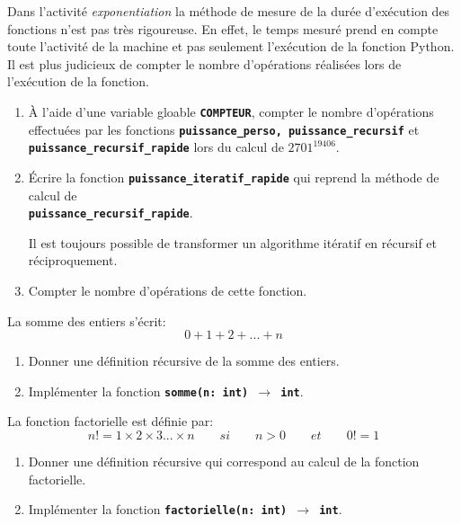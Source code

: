 \documentclass[a4paper,11pt]{article}
\begin{document}
\begin{exo}
    Dans l'activité \emph{exponentiation} la méthode de mesure de la durée d'exécution des fonctions n'est pas très rigoureuse. En effet, le temps mesuré prend en compte toute l'activité de la machine et pas seulement l'exécution de la fonction Python. Il est plus judicieux de compter le nombre d'opérations réalisées lors de l'exécution de la fonction.
    \begin{enumerate}
        \item À l'aide d'une variable gloable \textbf{\texttt{COMPTEUR}}, compter le nombre d'opérations effectuées par les fonctions \textbf{\texttt{puissance\_perso, puissance\_recursif}} et \textbf{\texttt{puissance\_recursif\_rapide}} lors du calcul de $2701^{19406}$.
        \item Écrire la fonction \textbf{\texttt{puissance\_iteratif\_rapide}} qui reprend la méthode de calcul de \\\textbf{\texttt{puissance\_recursif\_rapide}}.
              \begin{aretenir}[Remarque]
                  Il est toujours possible de transformer un algorithme itératif en récursif et réciproquement.
              \end{aretenir}
        \item Compter le nombre d'opérations de cette fonction.
    \end{enumerate}
\end{exo}
\begin{exo}
    La somme des entiers s'écrit:
    $$0+1+2+...+n$$
    \begin{enumerate}
        \item Donner une définition récursive de la somme des entiers.
        \item Implémenter la fonction \texttt{\textbf{somme(n: int) $\rightarrow$ int}}.
    \end{enumerate}
\end{exo}
\begin{exo}
    La fonction factorielle est définie par:
    $$n!=1×2×3...×n \qquad si\qquad n>0 \qquad et \qquad 0!=1$$
    \begin{enumerate}
        \item Donner une définition récursive qui correspond au calcul de la fonction factorielle.
        \item Implémenter la fonction \texttt{\textbf{factorielle(n: int) $\rightarrow$ int}}.
    \end{enumerate}
\end{exo}
\end{document}
